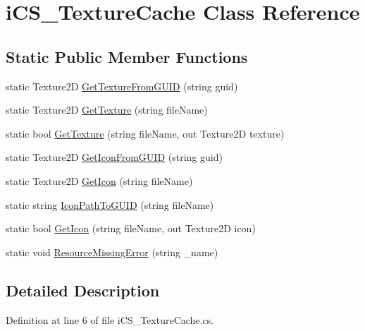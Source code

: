 \hypertarget{classi_c_s___texture_cache}{\section{i\+C\+S\+\_\+\+Texture\+Cache Class Reference}
\label{classi_c_s___texture_cache}
}
\subsection*{Static Public Member Functions}
\begin{DoxyCompactItemize}
\item 
static Texture2\+D \hyperlink{classi_c_s___texture_cache_ae16f5aa744d1c4ed5ac696f842ef9eaa}{Get\+Texture\+From\+G\+U\+I\+D} (string guid)
\item 
static Texture2\+D \hyperlink{classi_c_s___texture_cache_a689efbbc358c87631046536e845f0706}{Get\+Texture} (string file\+Name)
\item 
static bool \hyperlink{classi_c_s___texture_cache_a7394588feab8e56834cf32478d1d786d}{Get\+Texture} (string file\+Name, out Texture2\+D texture)
\item 
static Texture2\+D \hyperlink{classi_c_s___texture_cache_afbec5e9a18c066dcc48f0caf561022ac}{Get\+Icon\+From\+G\+U\+I\+D} (string guid)
\item 
static Texture2\+D \hyperlink{classi_c_s___texture_cache_a88a0a65508e8620bc406ed965203757c}{Get\+Icon} (string file\+Name)
\item 
static string \hyperlink{classi_c_s___texture_cache_aa8923d22bf05a0ad9897bad4672726eb}{Icon\+Path\+To\+G\+U\+I\+D} (string file\+Name)
\item 
static bool \hyperlink{classi_c_s___texture_cache_acbc9eafe8f4a0a7c3d686fe8c01175df}{Get\+Icon} (string file\+Name, out Texture2\+D icon)
\item 
static void \hyperlink{classi_c_s___texture_cache_ac04ffc69fdbe38f36628eb29ad3e98c3}{Resource\+Missing\+Error} (string \+\_\+name)
\end{DoxyCompactItemize}


\subsection{Detailed Description}


Definition at line 6 of file i\+C\+S\+\_\+\+Texture\+Cache.\+cs.



